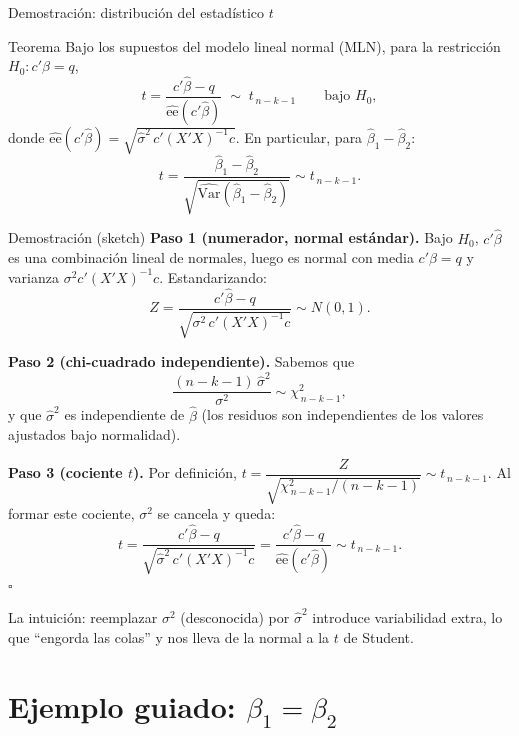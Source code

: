 \documentclass{beamer}
\begin{document}
\begin{frame}[allowframebreaks]{Demostración: distribución del estadístico $t$}
\begin{alertblock}{Teorema}
Bajo los supuestos del modelo lineal normal (MLN), para la restricción $H_0: c'\beta=q$,
\[
t = \frac{c'\hat{\beta} - q}{\widehat{\text{ee}}(c'\hat{\beta})} \;\sim\; t_{\,n-k-1}\qquad\text{bajo }H_0,
\]
donde $\widehat{\text{ee}}(c'\hat{\beta})=\sqrt{\hat{\sigma}^2\,c'(X'X)^{-1}c}$. En particular, para $\hat{\beta}_1-\hat{\beta}_2$:
\[
t=\frac{\hat{\beta}_1-\hat{\beta}_2}{\sqrt{\hat{\text{Var}}(\hat{\beta}_1-\hat{\beta}_2)}}\sim t_{\,n-k-1}.
\]
\end{alertblock}

\begin{exampleblock}{Demostración (sketch)}
\textbf{Paso 1 (numerador, normal estándar).} Bajo $H_0$, $c'\hat{\beta}$ es una combinación lineal de normales, luego es normal con media $c'\beta=q$ y varianza $\sigma^2 c'(X'X)^{-1}c$. Estandarizando:
\[
Z=\frac{c'\hat{\beta}-q}{\sqrt{\sigma^2\,c'(X'X)^{-1}c}}\sim N(0,1).
\]
\framebreak

\textbf{Paso 2 (chi-cuadrado independiente).} Sabemos que
\[
\frac{(n-k-1)\,\hat{\sigma}^2}{\sigma^2}\sim \chi^2_{\,n-k-1},
\]
y que $\hat{\sigma}^2$ es independiente de $\hat{\beta}$ (los residuos son independientes de los valores ajustados bajo normalidad).

\textbf{Paso 3 (cociente $t$).} Por definición, $t=\dfrac{Z}{\sqrt{\chi^2_{\,n-k-1}/(n-k-1)}}\sim t_{\,n-k-1}$. Al formar este cociente, $\sigma^2$ se cancela y queda:
\[
t=\frac{c'\hat{\beta}-q}{\sqrt{\hat{\sigma}^2\,c'(X'X)^{-1}c}}
=\frac{c'\hat{\beta}-q}{\widehat{\text{ee}}(c'\hat{\beta})}\sim t_{\,n-k-1}.
\]
\hfill $\square$
\end{exampleblock}
La intuición: reemplazar $\sigma^2$ (desconocida) por $\hat{\sigma}^2$ introduce variabilidad extra, lo que ``engorda las colas'' y nos lleva de la normal a la $t$ de Student.
\end{frame}

\section{Ejemplo guiado: $\beta_1=\beta_2$}
\end{document}
